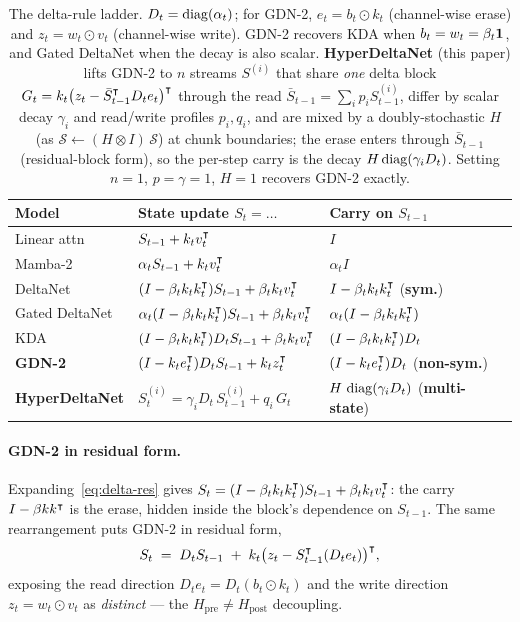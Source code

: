 \documentclass[11pt,letterpaper,logo]{yalearxiv}
\newcommand{\Hpre}{H_{\mathrm{pre}}}
\newcommand{\Hpost}{H_{\mathrm{post}}}
\newcommand{\Sbb}{\boldsymbol{\mathcal{S}}}    %
\begin{document}
\begin{table}[t]
\centering
\small
\begin{tabular}{@{}lll@{}}
\toprule
Model & State update $S_t=\dots$ & Carry on $S_{t-1}$ \\
\midrule
Linear attn & $S_{t-1} + k_t v_t^{\intercal}$ & $I$ \\
Mamba-2 & $\alpha_t S_{t-1} + k_t v_t^{\intercal}$ & $\alpha_t I$ \\
DeltaNet & $(I - \beta_t k_t k_t^{\intercal})S_{t-1} + \beta_t k_t v_t^{\intercal}$ & $I - \beta_t k_t k_t^{\intercal}$ (\textbf{sym.}) \\
Gated DeltaNet & $\alpha_t(I - \beta_t k_t k_t^{\intercal})S_{t-1} + \beta_t k_t v_t^{\intercal}$ & $\alpha_t(I - \beta_t k_t k_t^{\intercal})$ \\
KDA & $(I - \beta_t k_t k_t^{\intercal})D_t S_{t-1} + \beta_t k_t v_t^{\intercal}$ & $(I - \beta_t k_t k_t^{\intercal})D_t$ \\
\textbf{GDN-2} & $(I - k_t e_t^{\intercal})D_t S_{t-1} + k_t z_t^{\intercal}$ & $(I - k_t e_t^{\intercal})D_t$ (\textbf{non-sym.}) \\
\midrule
\textbf{HyperDeltaNet} & $S_t^{(i)} = \gamma_i D_t\, S_{t-1}^{(i)} + q_i\, G_t$ & $H\,\operatorname{diag}(\gamma_i D_t)$ (\textbf{multi-state}) \\
\bottomrule
\end{tabular}
\caption{The delta-rule ladder. $D_t=\operatorname{diag}(\alpha_t)$; for GDN-2, $e_t = b_t \odot k_t$
(channel-wise erase) and $z_t = w_t \odot v_t$ (channel-wise write). GDN-2 recovers KDA
when $b_t = w_t = \beta_t \mathbf 1$, and Gated DeltaNet when the decay is also scalar.
\textbf{HyperDeltaNet} (this paper) lifts GDN-2 to $n$ streams $S^{(i)}$ that share
\emph{one} delta block $G_t = k_t\big(z_t - \bar S_{t-1}^{\intercal} D_t e_t\big)^{\intercal}$
through the read $\bar S_{t-1} = \sum_i p_i S_{t-1}^{(i)}$, differ by scalar decay
$\gamma_i$ and read/write profiles $p_i,q_i$, and are mixed by a doubly-stochastic $H$ (as
$\Sbb \leftarrow (H\otimes I)\,\Sbb$) at chunk boundaries; the erase enters through
$\bar S_{t-1}$ (residual-block form), so the per-step carry is the decay
$H\operatorname{diag}(\gamma_i D_t)$. Setting $n{=}1$, $p{=}\gamma{=}1$, $H{=}1$ recovers GDN-2
exactly.}
\label{tab:ladder}
\end{table}

\paragraph{GDN-2 in residual form.} Expanding~\eqref{eq:delta-res} gives
$S_t = (I - \beta_t k_t k_t^{\intercal})S_{t-1} + \beta_t k_t v_t^{\intercal}$: the carry
$I - \beta k k^{\intercal}$ is the erase, hidden inside the block's dependence on
$S_{t-1}$. The same rearrangement puts GDN-2 in residual form,
\begin{equation}
  S_t \;=\; D_t S_{t-1} \;+\; k_t\big(z_t - S_{t-1}^{\intercal}(D_t e_t)\big)^{\intercal},
  \label{eq:gdn2-res}
\end{equation}
exposing the read direction $D_t e_t = D_t(b_t \odot k_t)$ and the write direction
$z_t = w_t \odot v_t$ as \emph{distinct} --- the $\Hpre \neq \Hpost$ decoupling.
\end{document}

